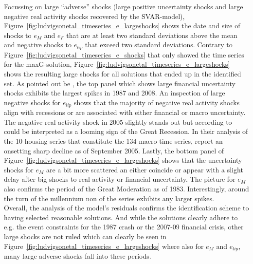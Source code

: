 \documentclass[a4paper,11pt,listof=nochaptergap,oneside,pointednumbers,bibtotoc,bigheadings,liststotoc]{scrbook}
\theoremstyle{mysatz}
\theoremstyle{mydefinition}
\theoremstyle{mytheorem}
\theoremstyle{mybemerkung}
\begin{document}
Focussing on large ``adverse'' shocks (large positive uncertainty shocks and large negative real activity shocks recovered by the SVAR-model), Figure~\ref{fig:ludvigsonetal_timeseries_e_largeshocks} shows the date and size of shocks to $e_M$ and $e_F$ that are at least two standard deviations above the mean and negative shocks to $e_{lip}$ that exceed two standard deviations. Contrary to Figure~\ref{fig:ludvigsonetal_timeseries_e_shocks} that only showed the time series for the maxG-solution, Figure~\ref{fig:ludvigsonetal_timeseries_e_largeshocks} shows the resulting large shocks for all solutions that ended up in the identified set. As pointed out be \citet{ludvigsonetal:18}, the top panel which shows large financial uncertainty shocks exhibits the largest spikes in 1987 and 2008. An inspection of large negative shocks for $e_{lip}$ shows that the majority of negative real activity shocks align with recessions or are associated with either financial or macro uncertainty. The negative real activity shock in 2005 slightly stands out but according to \citet{ludvigsonetal:18} could be interpreted as a looming sign of the Great Recession. In their analysis of the 10 housing series that constitute the 134 macro time series, \citet{ludvigsonetal:18} report an onsetting sharp decline as of September 2005. Lastly, the bottom panel of Figure~\ref{fig:ludvigsonetal_timeseries_e_largeshocks} shows that the uncertainty shocks for $e_M$ are a bit more scattered an either coincide or appear with a slight delay after big shocks to real activity or financial uncertainty. The picture for $e_M$ also confirms the period of the Great Moderation as of 1983. Interestingly, around the turn of the millennium non of the series exhibits any larger spikes.\\

Overall, the analysis of the model's residuals confirms the identification scheme to having selected reasonable solutions. And while the solutions clearly adhere to e.g. the event constraints for the 1987 crash or the 2007-09 financial crisis, other large shocks are not ruled which can clearly be seen in Figure~\ref{fig:ludvigsonetal_timeseries_e_largeshocks} where also for $e_M$ and $e_{lip}$, many large adverse shocks fall into these periods.
\end{document}
